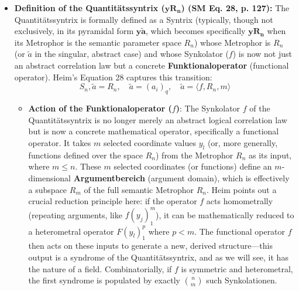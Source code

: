 \documentclass[12pt]{article}
\newcommand{\syntrix}{\bm{y\widetilde{a}}}
\newcommand{\quantitaetssyntrix}{\bm{yR_n}}
\begin{document}
\begin{itemize}
    \item \textbf{Definition of the Quantitätssyntrix (\( \quantitaetssyntrix \)) (SM Eq. 28, p. 127):}
    The Quantitätssyntrix is formally defined as a Syntrix (typically, though not exclusively, in its pyramidal form \( \syntrix \), which becomes specifically \( \quantitaetssyntrix \) when its Metrophor is the semantic parameter space \( R_n \)) whose Metrophor is \( R_n \) (or \( \widetilde{a} \) in the singular, abstract case) and whose Synkolator (\( f \)) is now not just an abstract correlation law but a concrete \textbf{Funktionaloperator} (functional operator). Heim's Equation 28 captures this transition:
    \begin{equation}
    S_n, \widetilde{a} = R_n, \quad \widetilde{a} = (a_i)_q, \quad \widetilde{a} = \langle f, R_n, m \rangle
    \label{eq:original_quantitaetssyntrix}
    \end{equation}
    \begin{itemize}
        \item \textbf{Action of the Funktionaloperator (\( f \))}: The Synkolator \( f \) of the Quantitätssyntrix is no longer merely an abstract logical correlation law but is now a concrete mathematical operator, specifically a functional operator. It takes \( m \) selected coordinate values \( y_l \) (or, more generally, functions defined over the space \( R_n \)) from the Metrophor \( R_n \) as its input, where \(m \le n\). These \( m \) selected coordinates (or functions) define an \( m \)-dimensional \textbf{Argumentbereich} (argument domain), which is effectively a subspace \( R_m \) of the full semantic Metrophor \( R_n \). Heim points out a crucial reduction principle here: if the operator \( f \) acts homometrally (repeating arguments, like \( f(y_j)_1^m \)), it can be mathematically reduced to a heterometral operator \( F(y_l)_1^p \) where \( p < m \). The functional operator \( f \) then acts on these inputs to generate a new, derived structure—this output is a syndrome of the Quantitätssyntrix, and as we will see, it has the nature of a field. Combinatorially, if \(f\) is symmetric and heterometral, the first syndrome is populated by exactly \(\binom{n}{m}\) such Synkolationen.
    \end{itemize}


\end{itemize}
\end{document}
